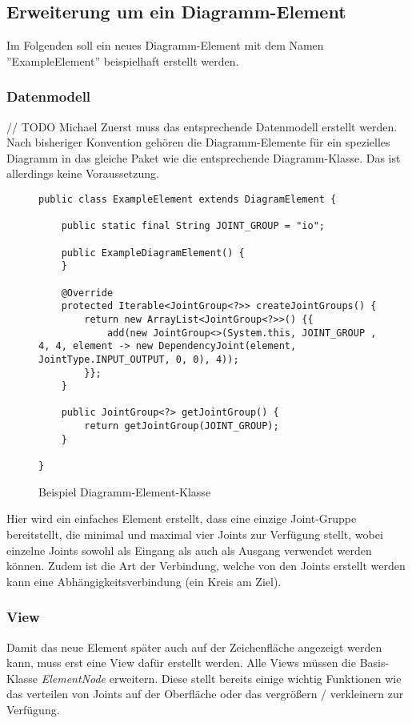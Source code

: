 \pagebreak
\subsection{Erweiterung um ein Diagramm-Element}
\label{add_element}
Im Folgenden soll ein neues Diagramm-Element mit dem Namen ''ExampleElement'' beispielhaft erstellt werden.

\subsubsection{Datenmodell}
// TODO Michael
Zuerst muss das entsprechende Datenmodell erstellt werden. Nach bisheriger Konvention gehören die Diagramm-Elemente
für ein spezielles Diagramm in das gleiche Paket wie die entsprechende Diagramm-Klasse. Das ist allerdings keine
Voraussetzung.

\begin{figure}[h!]
	\centering
	\begin{lstlisting}
public class ExampleElement extends DiagramElement {

    public static final String JOINT_GROUP = "io";

    public ExampleDiagramElement() {
    }

    @Override
    protected Iterable<JointGroup<?>> createJointGroups() {
        return new ArrayList<JointGroup<?>>() {{
            add(new JointGroup<>(System.this, JOINT_GROUP , 4, 4, element -> new DependencyJoint(element, JointType.INPUT_OUTPUT, 0, 0), 4));
        }};
    }

    public JointGroup<?> getJointGroup() {
        return getJointGroup(JOINT_GROUP);
    }

}
	\end{lstlisting}
	\caption{Beispiel Diagramm-Element-Klasse}
\end{figure}
Hier wird ein einfaches Element erstellt, dass eine einzige Joint-Gruppe bereitstellt, die minimal und maximal
vier Joints zur Verfügung stellt, wobei einzelne Joints sowohl als Eingang als auch als Ausgang verwendet werden
können. Zudem ist die Art der Verbindung, welche von den Joints erstellt werden kann eine Abhängigkeitsverbindung
(ein Kreis am Ziel).
\subsubsection{View}
Damit das neue Element später auch auf der Zeichenfläche angezeigt werden kann, muss erst eine View dafür erstellt
werden. Alle Views müssen die Basis-Klasse \textit{ElementNode} erweitern. Diese stellt bereits einige wichtig
Funktionen wie das verteilen von Joints auf der Oberfläche oder das vergrößern / verkleinern zur Verfügung.

